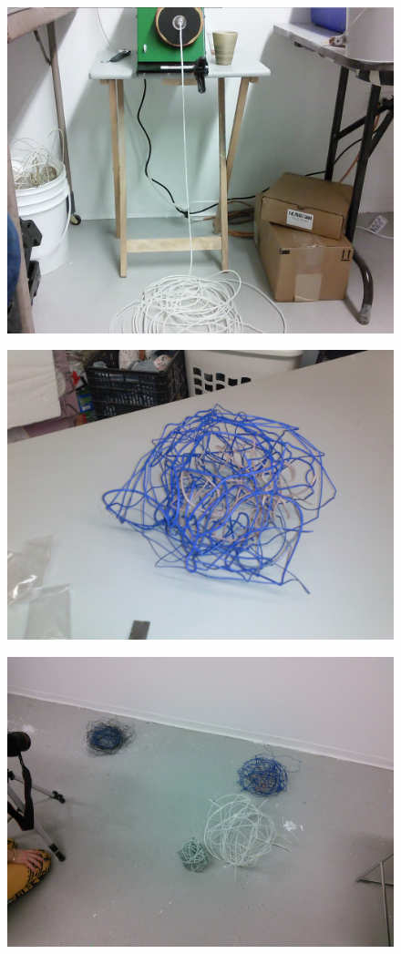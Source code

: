 \begin{figure}[h!]
\centering
\includegraphics[width=\hsize]{art/extruding.png}
\caption{\label{fig:art_2}  }
\end{figure}

\begin{figure}[h!]
\centering
\includegraphics[width=\hsize]{art/CAM00454.jpg}
\caption{\label{fig:art_1}  }
\end{figure}



\begin{figure}[h!]
\centering
\includegraphics[width=\hsize]{art/IMG_20160205_113249.jpg}
\caption{\label{fig:art_3}  }
\end{figure}